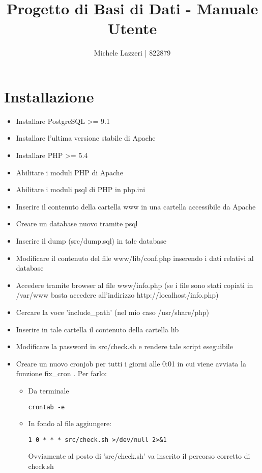 \documentclass[a4paper,10pt]{article}
\title{Progetto di Basi di Dati - Manuale Utente}
\author{Michele Lazzeri | 822879}
\date{}
\begin{document}
\maketitle
\section{Installazione}
\begin{itemize}
\item Installare PostgreSQL >= 9.1
\item Installare l'ultima versione stabile di Apache
\item Installare PHP >= 5.4
\item Abilitare i moduli PHP di Apache
\item Abilitare i moduli psql di PHP in php.ini
\item Inserire il contenuto della cartella www in una cartella accessibile da Apache
\item Creare un database nuovo tramite psql
\item Inserire il dump (src/dump.sql) in tale database
\item Modificare il contenuto del file www/lib/conf.php inserendo i dati relativi al database
\item Accedere tramite browser al file www/info.php (se i file sono stati copiati in /var/www basta accedere all'indirizzo http://localhost/info.php)
\item Cercare la voce 'include\_{}path' (nel mio caso /usr/share/php)
\item Inserire in tale cartella il contenuto della cartella lib
\item Modificare la password in src/check.sh e rendere tale script eseguibile
\item Creare un nuovo cronjob per tutti i giorni alle 0:01 in cui viene avviata la funzione fix\_{}cron . Per farlo:
\begin{itemize}
\item Da terminale \begin{verbatim}
crontab -e
\end{verbatim}
\item In fondo al file aggiungere:
\begin{verbatim}
1 0 * * * src/check.sh >/dev/null 2>&1
\end{verbatim}
Ovviamente al posto di 'src/check.sh' va inserito il percorso corretto di check.sh
\end{itemize}

\end{itemize}
\end{document}

